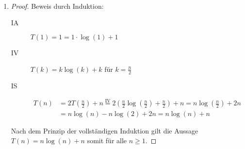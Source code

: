 \documentclass[11pt,a4paper]{article}
\begin{document}
\begin{loesung}
\begin{enumerate}
    \item
    \begin{proof}
        Beweis durch Induktion:
        \begin{description}
            \item[IA] $T(1) = 1 = 1 \cdot \log(1) + 1$
            \item[IV] $T(k) = k \log(k) + k$ für $k = \frac{n}{2}$
            \item[IS] 
            \begin{align*}
                T(n) &= 2T\left(\frac{n}{2}\right) + n
                \overset{\text{IV}}{=} 2 \left( \frac{n}{2} \log\left(\frac{n}{2}\right) + \frac{n}{2} \right) + n
                = n\log\left(\frac{n}{2} \right) + 2n \\
                &= n \log(n) - n \log(2) + 2n
                = n\log(n) + n
            \end{align*}
        \end{description}
        Nach dem Prinzip der vollständigen Induktion gilt die Aussage $T(n) = n\log(n) + n$ somit für alle $n \geq 1$.
    \end{proof}


\end{enumerate}
\end{loesung}
\end{document}
